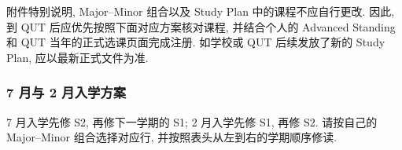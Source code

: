 \documentclass{jit-qut}
\begin{document}
附件特别说明, Major--Minor 组合以及 Study Plan 中的课程不应自行更改. 因此, 到 QUT 后应优先按照下面对应方案核对课程, 并结合个人的 Advanced Standing 和 QUT 当年的正式选课页面完成注册. 如学校或 QUT 后续发放了新的 Study Plan, 应以最新正式文件为准.

\begingroup
\small
{}
\renewcommand{\arraystretch}{0.9}
\setlength{\LTpre}{0pt}
\setlength{\LTpost}{0.35em}

\newcommand{\qutcell}[1]{%
\begin{minipage}[t]{\linewidth}\raggedright #1\end{minipage}}

\newcommand{\qutlabel}[1]{%
\begin{minipage}[t]{0.15\textwidth}\raggedright #1\end{minipage}}

\newcommand{\qutfirstrow}[5]{%
\cellcolor{white}\multirow[t]{4}{*}{\qutlabel{#1}} &
\qutcell{#2} &
\qutcell{#3} &
\qutcell{#4} &
\qutcell{#5}\\}

\newcommand{\qutnextrow}[4]{%
\cellcolor{white} & \qutcell{#1} &
\qutcell{#2} &
\qutcell{#3} &
\qutcell{#4}\\}

\subsubsection{7 月与 2 月入学方案}
{\footnotesize 7 月入学先修 S2, 再修下一学期的 S1; 2 月入学先修 S1, 再修 S2. 请按自己的 Major--Minor 组合选择对应行, 并按照表头从左到右的学期顺序修读.\par}
\end{document}
